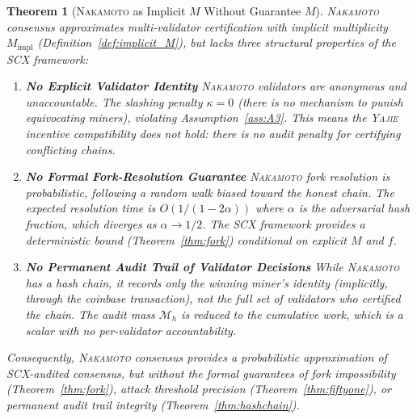 \documentclass[11pt,a4paper]{article}
\newtheorem{theorem}{Theorem}[section]
\theoremstyle{definition}
\newcommand{\Yajie}{\textsc{Yajie}}
\newcommand{\SCX}{\textsc{SCX}}
\newcommand{\Nakamoto}{\textsc{Nakamoto}}
\begin{document}
\begin{theorem}[\Nakamoto{} as Implicit $M$ Without Guarantee $M$]
\label{thm:nakamoto_implicit}
\Nakamoto{} consensus approximates multi-validator certification with implicit multiplicity $M_{\mathrm{impl}}$ (Definition~\ref{def:implicit_M}), but lacks three structural properties of the \SCX{} framework:
\begin{enumerate}[label=(\roman*)]
    \item \textbf{No Explicit Validator Identity} \Nakamoto{} validators are anonymous and unaccountable. The slashing penalty $\kappa = 0$ (there is no mechanism to punish equivocating miners), violating Assumption~\ref{ass:A3}. This means the \Yajie{} incentive compatibility does not hold: there is no audit penalty for certifying conflicting chains.
    \item \textbf{No Formal Fork-Resolution Guarantee} \Nakamoto{} fork resolution is probabilistic, following a random walk biased toward the honest chain. The expected resolution time is $O(1/(1-2\alpha))$ where $\alpha$ is the adversarial hash fraction, which diverges as $\alpha \to 1/2$. The \SCX{} framework provides a deterministic bound (Theorem~\ref{thm:fork}) conditional on explicit $M$ and $f$.
    \item \textbf{No Permanent Audit Trail of Validator Decisions} While \Nakamoto{} has a hash chain, it records only the winning miner's identity (implicitly, through the coinbase transaction), not the full set of validators who certified the chain. The audit mass $\mathcal{M}_h$ is reduced to the cumulative work, which is a scalar with no per-validator accountability.
\end{enumerate}
Consequently, \Nakamoto{} consensus provides a probabilistic approximation of \SCX{}-audited consensus, but without the formal guarantees of fork impossibility (Theorem~\ref{thm:fork}), attack threshold precision (Theorem~\ref{thm:fiftyone}), or permanent audit trail integrity (Theorem~\ref{thm:hashchain}).
\end{theorem}
\end{document}
